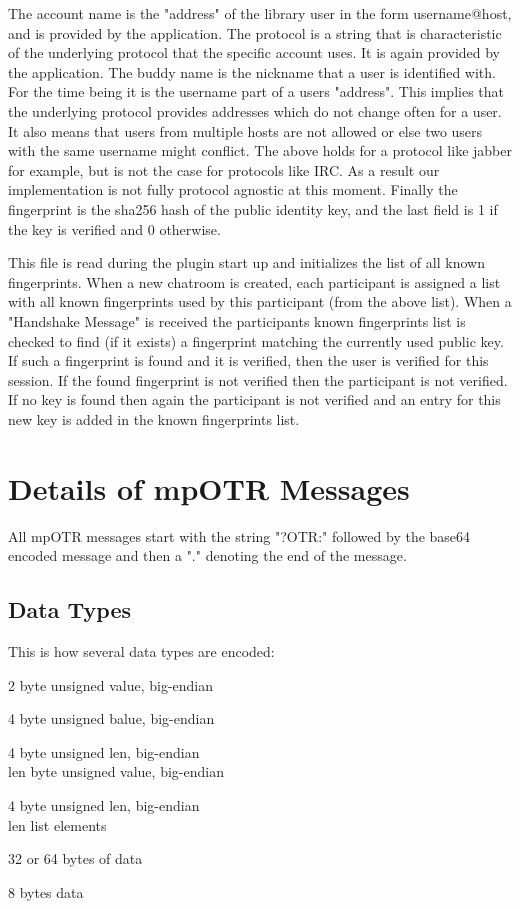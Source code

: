 The account name is the "address" of the library user in the form username@host, and is provided by the application.
The protocol is a string that is characteristic of the underlying protocol that the specific account uses.
It is again provided by the application.
The buddy name is the nickname that a user is identified with.
For the time being it is the username part of a users "address".
This implies that the underlying protocol provides addresses which do not change often for a user.
It also means that users from multiple hosts are not allowed or else two users with the same username might conflict.
The above holds for a protocol like jabber for example, but is not the case for protocols like IRC.
As a result our implementation is not fully protocol agnostic at this moment.
Finally the fingerprint is the sha256 hash of the public identity key, and the last field is 1 if the key is verified and 0 otherwise.

This file is read during the plugin start up and initializes the list of all known fingerprints.
When a new chatroom is created, each participant is assigned a list with all known fingerprints used by this participant (from the above list).
When a "Handshake Message" is received the participants known fingerprints list is checked to find (if it exists) a fingerprint matching the currently used public key.
If such a fingerprint is found and it is verified, then the user is verified for this session.
If the found fingerprint is not verified then the participant is not verified.
If no key is found then again the participant is not verified and an entry for this new key is added in the known fingerprints list.

\section{Details of mpOTR Messages}
All mpOTR messages start with the string "?OTR:" followed by the base64 encoded message and then a "." denoting the end of the message.

\subsection{Data Types}
This is how several data types are encoded:
\begin{description}[align=left]
\item [Shorts:] 2 byte unsigned value, big-endian
\item [Integers:] 4 byte unsigned balue, big-endian
\item [Multi Precision Integers:] 4 byte unsigned len, big-endian \\
len byte unsigned value, big-endian
\item [Lists:] 4 byte unsigned len, big-endian \\
len list elements
\item[Hashes:] 32 or 64 bytes of data
\item[CTR-mode counter value:] 8 bytes data
\end{description}


